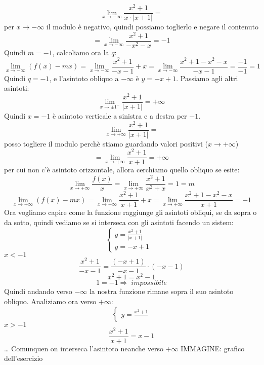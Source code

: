 \[
    \lim_{x\rightarrow -\infty} \frac{x^2+1}{x \cdot |x+1|} = 
\]
per $x \rightarrow - \infty$ il modulo è negativo, quindi possiamo toglierlo e negare il contenuto
\[
    =\lim_{x\rightarrow - \infty} \frac{x^2+1}{-x^2 -x} = -1
\]
Quindi $m=-1$, calcoliamo ora la $q$:
\[
    \lim_{x\rightarrow -\infty} ( f(x) -mx) = \lim_{x\rightarrow -\infty} \frac{x^2 +1}{-x-1} +x = \lim_{x\rightarrow -\infty} \frac{x^2 +1 -x^2-x}{-x-1} = \frac{-1}{-1} = 1
\]
Quindi $q = -1$, e l'asintoto obliquo a $-\infty$ è $y= -x +1$.
\newline
Passiamo agli altri asintoti:
\[
    \lim_{x\rightarrow \pm 1^-} \frac{x^2+1}{|x+1|} = + \infty
\]
Quindi $ x= -1$ è asintoto verticale a sinistra e a destra per $-1$.
\newline
\[
    \lim_{x\rightarrow +\infty} \frac{x^2+1}{|x+1|} = 
\]
posso togliere il modulo perchè stiamo guardando valori positivi ($x \rightarrow  + \infty$)
\[
    = \lim_{x\rightarrow + \infty} \frac{x^2 +1}{x+1} = + \infty
\]
per cui non c'è asintoto orizzontale, allora cerchiamo quello obliquo se esite:
\[
    \lim_{x\rightarrow + \infty} \frac{f(x)}{x} = \lim_{x\rightarrow + \infty} \frac{x^2+1}{x^2+x} = 1 = m
\]
\[
    \lim_{x\rightarrow +\infty} (f(x) - mx) = \lim_{x\rightarrow + \infty} \frac{x^2+1}{x+1}+x = \lim_{x\rightarrow +\infty} \frac{x^2 +1-x^2 -x}{x+1} = -1
\]
Ora vogliamo capire come la funzione raggiunge gli asintoti obliqui, se da sopra o da sotto, quindi vediamo se si interseca con gli asintoti facendo un sistem:
\[
    \begin{cases}
        y = \frac{x^2+1}{|x+1|} & \\
        y= -x +1 &
    \end{cases}
\]
$x< -1$
\[
    \frac{x^2 +1}{-x-1} = \frac{(-x+1)}{-x-1}\cdot (-x-1)
\]
\[
    x^2 +1 = x^2 -1
\]
\[
    1 = -1 \Rightarrow \; impossibile
\]
Quindi andando verso $-\infty$ la nostra funzione rimane sopra il suo asintoto obliquo.
\newline
Analiziamo ora verso $+ \infty$:
\[
    \begin{cases}
        y = \frac{x^2 +1}{}
    \end{cases}
\]
$x> -1$
\[
    \frac{x^2 +1}{x+1} = x-1 
\]
\dots
\newline
[manca]
\newline
Comunquen on interseca l'asintoto neanche verso $+ \infty$
\newline
IMMAGINE: grafico dell'esercizio
\newline
\newline
\newline
